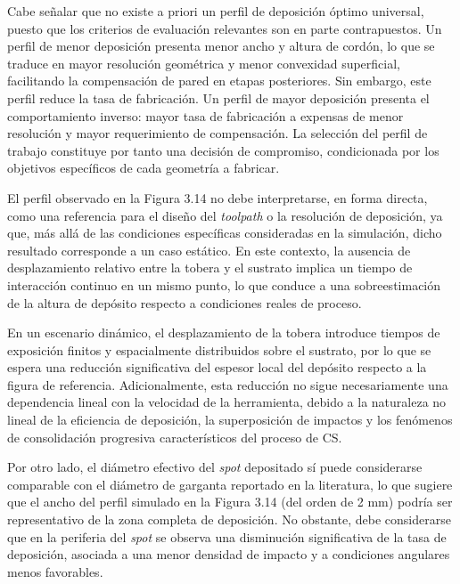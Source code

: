 Cabe señalar que no existe a priori un perfil de deposición óptimo universal, puesto que 
los criterios de evaluación relevantes son en parte contrapuestos. Un perfil de menor 
deposición presenta menor ancho y altura de cordón, lo que se traduce en mayor resolución 
geométrica y menor convexidad superficial, facilitando la compensación de pared en etapas 
posteriores. Sin embargo, este perfil reduce la tasa de fabricación. Un perfil de mayor 
deposición presenta el comportamiento inverso: mayor tasa de fabricación a expensas de 
menor resolución y mayor requerimiento de compensación. La selección del perfil de trabajo 
constituye por tanto una decisión de compromiso, condicionada por los objetivos específicos 
de cada geometría a fabricar.

El perfil observado en la Figura 3.14 no debe interpretarse, en forma directa, como una referencia para el diseño del \textit{toolpath} o la resolución de deposición, ya que, más allá de las condiciones específicas consideradas en la simulación, dicho resultado corresponde a un caso estático. En este contexto, la ausencia de desplazamiento relativo entre la tobera y el sustrato implica un tiempo de interacción continuo en un mismo punto, lo que conduce a una sobreestimación de la altura de depósito respecto a condiciones reales de proceso.

En un escenario dinámico, el desplazamiento de la tobera introduce tiempos de exposición finitos y espacialmente distribuidos sobre el sustrato, por lo que se espera una reducción significativa del espesor local del depósito respecto a la figura de referencia. Adicionalmente, esta reducción no sigue necesariamente una dependencia lineal con la velocidad de la herramienta, debido a la naturaleza no lineal de la eficiencia de deposición, la superposición de impactos y los fenómenos de consolidación progresiva característicos del proceso de CS.

Por otro lado, el diámetro efectivo del \textit{spot} depositado sí puede considerarse comparable con el diámetro de garganta reportado en la literatura, lo que sugiere que el ancho del perfil simulado en la Figura 3.14 (del orden de 2 mm) podría ser representativo de la zona completa de deposición. No obstante, debe considerarse que en la periferia del \textit{spot} se observa una disminución significativa de la tasa de deposición, asociada a una menor densidad de impacto y a condiciones angulares menos favorables.


